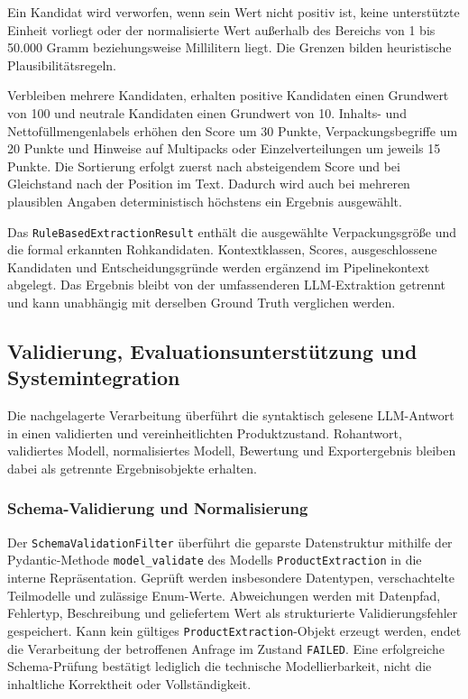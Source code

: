 Ein Kandidat wird verworfen, wenn sein Wert nicht positiv ist, keine unterstützte Einheit vorliegt oder der normalisierte Wert außerhalb des Bereichs von 1 bis 50.000 
Gramm beziehungsweise Millilitern liegt. Die Grenzen bilden heuristische Plausibilitätsregeln.

Verbleiben mehrere Kandidaten, erhalten positive Kandidaten einen Grundwert von 100 und neutrale Kandidaten einen Grundwert von 10. Inhalts- und Nettofüllmengenlabels 
erhöhen den Score um 30 Punkte, Verpackungsbegriffe um 20 Punkte und Hinweise auf Multipacks oder Einzelverteilungen um jeweils 15 Punkte. Die Sortierung erfolgt zuerst 
nach absteigendem Score und bei Gleichstand nach der Position im Text. Dadurch wird auch bei mehreren plausiblen Angaben deterministisch höchstens ein Ergebnis ausgewählt.

Das \texttt{RuleBasedExtractionResult} enthält die ausgewählte Verpackungsgröße und die formal erkannten Rohkandidaten. Kontextklassen, Scores, ausgeschlossene Kandidaten 
und Entscheidungsgründe werden ergänzend im Pipelinekontext abgelegt. Das Ergebnis bleibt von der umfassenderen LLM-Extraktion getrennt und kann unabhängig mit derselben 
Ground Truth verglichen werden.

\subsection{Validierung, Evaluationsunterstützung und Systemintegration}

Die nachgelagerte Verarbeitung überführt die syntaktisch gelesene LLM-Antwort in einen validierten und vereinheitlichten Produktzustand. Rohantwort, validiertes Modell, 
normalisiertes Modell, Bewertung und Exportergebnis bleiben dabei als getrennte Ergebnisobjekte erhalten.

\subsubsection{Schema-Validierung und Normalisierung}

Der \texttt{SchemaValidationFilter} überführt die geparste Datenstruktur mithilfe der Pydantic-Methode \texttt{model\_validate} des Modells \texttt{ProductExtraction} in 
die interne Repräsentation. Geprüft werden insbesondere Datentypen, verschachtelte Teilmodelle und zulässige Enum-Werte. Abweichungen werden mit Datenpfad, Fehlertyp, 
Beschreibung und geliefertem Wert als strukturierte Validierungsfehler gespeichert. Kann kein gültiges \texttt{ProductExtraction}-Objekt erzeugt werden, endet die Verarbeitung 
der betroffenen Anfrage im Zustand \texttt{FAILED}. Eine erfolgreiche Schema-Prüfung bestätigt lediglich die technische Modellierbarkeit, nicht die inhaltliche Korrektheit 
oder Vollständigkeit.

